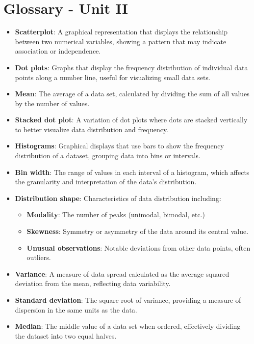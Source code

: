 \documentclass{article}
\begin{document}
\section*{Glossary - Unit II}

\begin{itemize}
    \item \textbf{Scatterplot}: A graphical representation that displays the relationship between two numerical variables, showing a pattern that may indicate association or independence.
    \item \textbf{Dot plots}: Graphs that display the frequency distribution of individual data points along a number line, useful for visualizing small data sets.
    \item \textbf{Mean}: The average of a data set, calculated by dividing the sum of all values by the number of values.
    \item \textbf{Stacked dot plot}: A variation of dot plots where dots are stacked vertically to better visualize data distribution and frequency.
    \item \textbf{Histograms}: Graphical displays that use bars to show the frequency distribution of a dataset, grouping data into bins or intervals.
    \item \textbf{Bin width}: The range of values in each interval of a histogram, which affects the granularity and interpretation of the data's distribution.
    \item \textbf{Distribution shape}: Characteristics of data distribution including:
    \begin{itemize}
        \item \textbf{Modality}: The number of peaks (unimodal, bimodal, etc.)
        \item \textbf{Skewness}: Symmetry or asymmetry of the data around its central value.
        \item \textbf{Unusual observations}: Notable deviations from other data points, often outliers.
    \end{itemize}
    \item \textbf{Variance}: A measure of data spread calculated as the average squared deviation from the mean, reflecting data variability.
    \item \textbf{Standard deviation}: The square root of variance, providing a measure of dispersion in the same units as the data.
    \item \textbf{Median}: The middle value of a data set when ordered, effectively dividing the dataset into two equal halves.

\end{itemize}
\end{document}
